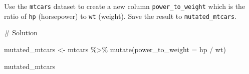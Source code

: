 \documentclass[
  letterpaper,
  DIV=11,
  numbers=noendperiod]{scrreprt}
\newenvironment{Shaded}{\begin{snugshade}}{\end{snugshade}}
\newcommand{\AttributeTok}[1]{\textcolor[rgb]{0.40,0.45,0.13}{#1}}
\newcommand{\CommentTok}[1]{\textcolor[rgb]{0.37,0.37,0.37}{#1}}
\newcommand{\FunctionTok}[1]{\textcolor[rgb]{0.28,0.35,0.67}{#1}}
\newcommand{\NormalTok}[1]{\textcolor[rgb]{0.00,0.23,0.31}{#1}}
\newcommand{\OtherTok}[1]{\textcolor[rgb]{0.00,0.23,0.31}{#1}}
\newcommand{\SpecialCharTok}[1]{\textcolor[rgb]{0.37,0.37,0.37}{#1}}
\begin{document}
Use the \texttt{mtcars} dataset to create a new column
\texttt{power\_to\_weight} which is the ratio of \texttt{hp}
(horsepower) to \texttt{wt} (weight). Save the result to
\texttt{mutated\_mtcars}.

\begin{Shaded}
\begin{Highlighting}[]
\CommentTok{\# Solution}

\NormalTok{mutated\_mtcars }\OtherTok{\textless{}{-}}\NormalTok{ mtcars }\SpecialCharTok{\%\textgreater{}\%}
  \FunctionTok{mutate}\NormalTok{(}\AttributeTok{power\_to\_weight =}\NormalTok{ hp }\SpecialCharTok{/}\NormalTok{ wt)}

\NormalTok{mutated\_mtcars}
\end{Highlighting}
\end{Shaded}
\end{document}
